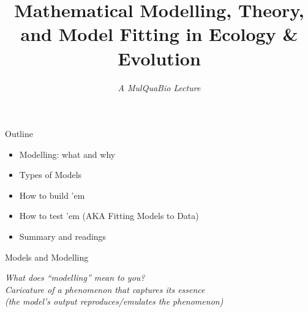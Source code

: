\documentclass[xcolor=x11names,compress, handout]{beamer}
\title[EnE Modelling]{Mathematical Modelling, Theory, and Model Fitting in Ecology \& Evolution}
\subtitle{\it A MulQuaBio Lecture}
\renewcommand{\(}{\begin{columns}}
\renewcommand{\)}{\end{columns}}
\newcommand{\<}[1]{\begin{column}{#1}}
\renewcommand{\>}{\end{column}}
\begin{document}

\begin{frame}[plain]
	\titlepage
\end{frame}

\begin{frame}{Outline}
	\begin{itemize}\setlength{\itemindent}{0em}\itemsep12pt
  
	  \item Modelling: what and why
  
	  \item Types of Models
	  
	  \item How to build 'em
	  
	  \item How to test 'em (AKA Fitting Models to Data)

	  \item Summary and readings
	  \end{itemize}  
  
  \end{frame}
  
\begin{frame}{Models and Modelling}

	\begin{center}

		\it What does ``modelling'' mean to you?\\
		\vspace{20pt}
		\pause 
		Caricature of a phenomenon that captures its essence \\ (the model's output reproduces/emulates the phenomenon)
		
	  \end{center}
 
 \end{frame}
\end{document}
